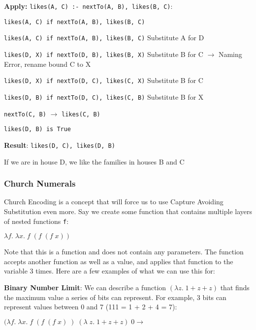\documentclass{article}
\begin{document}
        \bigskip
        \textbf{Apply:} \lstinline{likes(A, C) :- nextTo(A, B), likes(B, C)}:
            
            \medskip
            \lstinline{likes(A, C) if nextTo(A, B), likes(B, C)}
            
            \lstinline{likes(A, C) if nextTo(A, B), likes(B, C)} Substitute A for D
            
            \lstinline{likes(D, X) if nextTo(D, B), likes(B, X)} Substitute B for C $\rightarrow$ Naming Error, rename bound C to X
            
            \lstinline{likes(D, X) if nextTo(D, C), likes(C, X)} Substitute B for C
            
            \lstinline{likes(D, B) if nextTo(D, C), likes(C, B)} Substitute B for X
            
            \lstinline{nextTo(C, B)} $\rightarrow$ \lstinline{likes(C, B)}
            
            \lstinline{likes(D, B) is True}
            
            \bigskip
            \textbf{Result}: \lstinline{likes(D, C), likes(D, B)}
            
            If we are in house D, we like the families in houses B and C
        
        \subsubsection{Church Numerals}
        Church Encoding is a concept that will force us to use Capture Avoiding Substitution even more. Say we create some function that contains multiple layers of nested functions \lstinline{f}:
        
        \medskip
        $\lambda  f. \; \lambda x. \; f \; (f \; (f \; x)) $
        
        \medskip\noindent
        Note that this is a function and does not contain any parameters. The function accepts another function as well as a value, and applies that function to the variable 3 times. Here are a few examples of what we can use this for:
        
        \bigskip\noindent
        \textbf{Binary Number Limit}: We can describe a function $(\lambda z. \; 1+z+z)$ that finds the maximum value a series of bits can represent. For example, 3 bits can represent values between 0 and 7 (111 = 1 + 2 + 4 = 7):
        
        \medskip
        $(\lambda f. \; \lambda x. \; f \; (f \; (f \; x) \; ) \; (\lambda \; z. \; 1+z+z) \; 0 \rightarrow$
        
\end{document}
